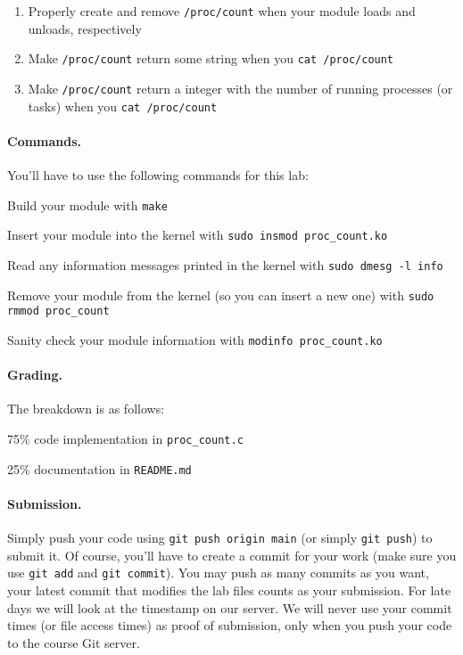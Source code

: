 \begin{enumerate}
  \item Properly create and remove \lstinline|/proc/count| when your module
        loads and unloads, respectively
  \item Make \lstinline|/proc/count| return some string when you
        \lstinline|cat /proc/count|
  \item Make \lstinline|/proc/count| return a integer with the number of running
        processes (or tasks) when you \lstinline|cat /proc/count|
\end{enumerate}

\paragraph{Commands.}

You'll have to use the following commands for this lab:

Build your module with \lstinline|make|

Insert your module into the kernel with \lstinline|sudo insmod proc_count.ko|

Read any information messages printed in the kernel with
\lstinline|sudo dmesg -l info|

Remove your module from the kernel (so you can insert a new one) with
\lstinline|sudo rmmod proc_count|

Sanity check your module information with \lstinline|modinfo proc_count.ko|

\paragraph{Grading.}

The breakdown is as follows:

75\% \hspace{0.5em} code implementation in \lstinline|proc_count.c|

25\% \hspace{0.5em} documentation in \lstinline|README.md|

\paragraph{Submission.}

Simply push your code using \lstinline|git push origin main| (or simply
\lstinline|git push|) to submit it.
Of course, you'll have to create a commit for your work (make sure you use
\texttt{git add} and \texttt{git commit}).
You may push as many commits as you want, your latest commit that modifies
the lab files counts as your submission.
For late days we will look at the timestamp on our server.
We will never use your commit times (or file access times) as proof of
submission, only when you push your code to the course Git server.


